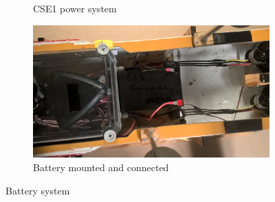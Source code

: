 \begin{figure}[htb!]
\begin{subfigure}{.45\linewidth}
	\caption{CSE1 power system}
	\label{fig: CSE1 power}
\end{subfigure}
\begin{subfigure}{0.45\linewidth}
	\centering
	\includegraphics[width=\linewidth]{fig/battery_mounted.jpg}
	\caption{Battery mounted and connected}
	\label{fig:battery_connected}
\end{subfigure}
\caption{Battery system}
\end{figure}


